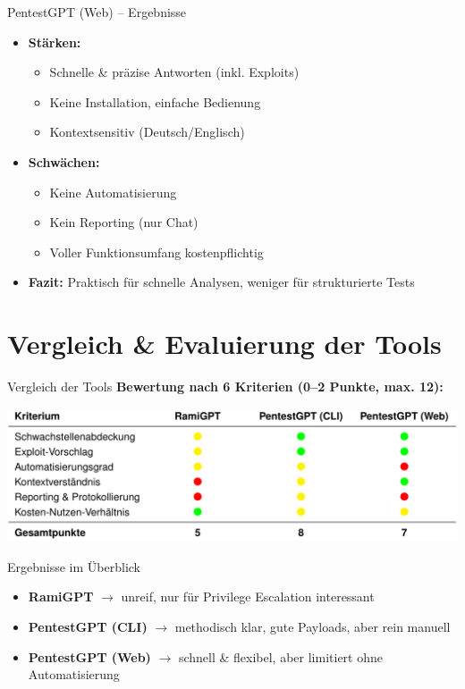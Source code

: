 \documentclass[
	aspectratio=169,	%
	onlytextwidth,		%
	t,					%
	]{beamer}
\begin{document}
\begin{frame}{PentestGPT (Web) – Ergebnisse}
	\begin{itemize}
		\item \textbf{Stärken:}
		\begin{itemize}
			\item Schnelle \& präzise Antworten (inkl. Exploits)
			\item Keine Installation, einfache Bedienung
			\item Kontextsensitiv (Deutsch/Englisch)
		\end{itemize}
		\vspace{2mm}
		\item \textbf{Schwächen:}
		\begin{itemize}
			\item Keine Automatisierung
			\item Kein Reporting (nur Chat)
			\item Voller Funktionsumfang kostenpflichtig
		\end{itemize}
		\vspace{2mm}
		\item \textbf{Fazit:}  
		Praktisch für schnelle Analysen, weniger für strukturierte Tests
	\end{itemize}
\end{frame}



\section{Vergleich \& Evaluierung der Tools}
\begin{frame}{Vergleich der Tools}
	\centering
	\textbf{Bewertung nach 6 Kriterien (0–2 Punkte, max. 12):}
	
	\vspace{5mm}
	\includegraphics[width=\textwidth]{figures/20.png}
	\label{fig:20}
\end{frame}

		
\begin{frame}{Ergebnisse im Überblick}
	\begin{itemize}
		\item \textbf{RamiGPT} $\rightarrow$ unreif, nur für Privilege Escalation interessant
		\item \textbf{PentestGPT (CLI)} $\rightarrow$ methodisch klar, gute Payloads, aber rein manuell
		\item \textbf{PentestGPT (Web)} $\rightarrow$ schnell \& flexibel, aber limitiert ohne Automatisierung
	\end{itemize}
\end{frame}
\end{document}
